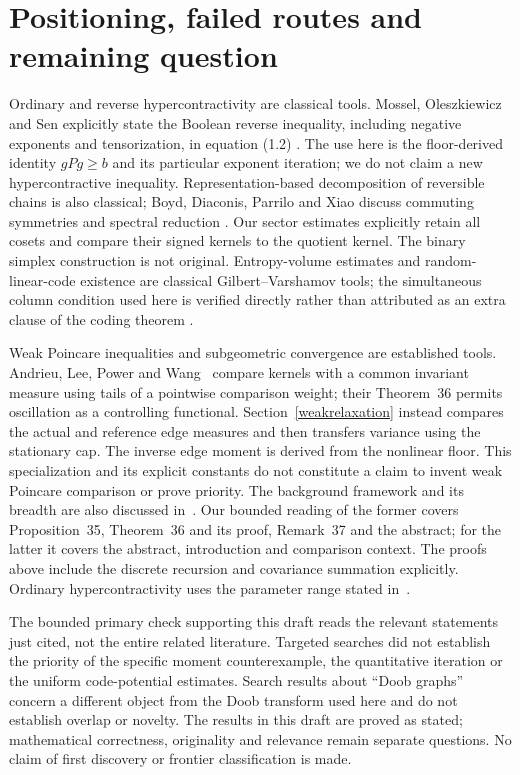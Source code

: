 \documentclass[11pt]{article}
\begin{document}
\section{Positioning, failed routes and remaining question}
Ordinary and reverse hypercontractivity are classical tools. Mossel, Oleszkiewicz and Sen explicitly state the Boolean reverse inequality, including negative exponents and tensorization, in equation (1.2) \cite{mos}. The use here is the floor-derived identity $gPg\geq b$ and its particular exponent iteration; we do not claim a new hypercontractive inequality. Representation-based decomposition of reversible chains is also classical; Boyd, Diaconis, Parrilo and Xiao discuss commuting symmetries and spectral reduction \cite{boyd}. Our sector estimates explicitly retain all cosets and compare their signed kernels to the quotient kernel. The binary simplex construction is not original. Entropy-volume estimates and random-linear-code existence are classical Gilbert--Varshamov tools; the simultaneous column condition used here is verified directly rather than attributed as an extra clause of the coding theorem \cite{guruswami}.

Weak Poincare inequalities and subgeometric convergence are established tools.
Andrieu, Lee, Power and Wang~\cite{alpw2022} compare kernels with a common
invariant measure using tails of a pointwise comparison weight; their
Theorem~36 permits oscillation as a controlling functional. Section~\ref{weakrelaxation}
instead compares the actual and reference edge measures and then transfers
variance using the stationary cap. The inverse edge moment is derived from
the nonlinear floor. This specialization and its explicit constants do not
constitute a claim to invent weak Poincare comparison or prove priority.
The background framework and its breadth are also discussed in~\cite{alpw2023}.
Our bounded reading of the former covers Proposition~35, Theorem~36 and its
proof, Remark~37 and the abstract; for the latter it covers the abstract,
introduction and comparison context. The proofs above include the discrete
recursion and covariance summation explicitly. Ordinary hypercontractivity
uses the parameter range stated in~\cite{odonnelllecture}.

The bounded primary check supporting this draft reads the relevant statements just cited, not the entire related literature. Targeted searches did not establish the priority of the specific moment counterexample, the quantitative iteration or the uniform code-potential estimates. Search results about ``Doob graphs'' concern a different object from the Doob transform used here and do not establish overlap or novelty. The results in this draft are proved as stated; mathematical correctness, originality and relevance remain separate questions. No claim of first discovery or frontier classification is made.
\end{document}
